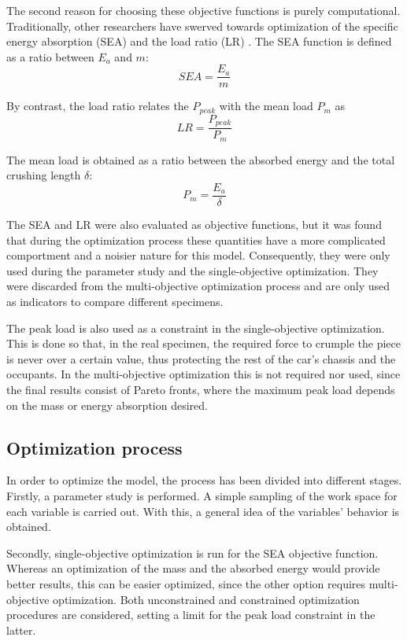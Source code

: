 \documentclass[cmfonts]{witpress}
\begin{document}
The second reason for choosing these objective functions is purely computational. Traditionally, other researchers have swerved towards optimization of the specific energy absorption (SEA) and the load ratio (LR) \cite{Hou2007555}. The SEA function is defined as a ratio between $E_a$ and $m$:
\begin{equation}\label{SEA}
  S\! EA=\dfrac {E_a} {m}
\end{equation}

By contrast, the load ratio relates the $P_{peak}$ with the mean load $P_m$ as
\begin{equation}\label{LR}
  LR=\dfrac {P_{peak}} {P_m}
\end{equation}

The mean load is obtained as a ratio between the absorbed energy and the total crushing length $\delta$:
\begin{equation}\label{Pm}
  P_{m}=\dfrac {E_a} {\delta}
\end{equation}

The SEA and LR were also evaluated as objective functions, but it was found that during the optimization process these quantities have a more complicated comportment and a noisier nature for this model. Consequently, they were only used during the parameter study and the single-objective optimization. They were discarded from the multi-objective  optimization process and are only used as indicators to compare different specimens.

The peak load is also used as a constraint in the single-objective optimization. This is done so that, in the real specimen, the required force to crumple the piece is never over a certain value, thus protecting the rest of the car's chassis and the occupants. In the multi-objective optimization this is not required nor used, since the final results consist of Pareto fronts, where the maximum peak load depends on the mass or energy absorption desired.

\subsection{Optimization process}

In order to optimize the model, the process has been divided into different stages. Firstly, a parameter study is performed. A simple sampling of the work space for each variable is carried out. With this, a general idea of the variables' behavior is obtained.

Secondly, single-objective optimization is run for the SEA objective function. Whereas an optimization of the mass and the absorbed energy would provide better results, this can be easier optimized, since the other option requires multi-objective optimization. Both unconstrained and constrained optimization procedures are considered, setting a limit for the peak load constraint in the latter.
\end{document}
